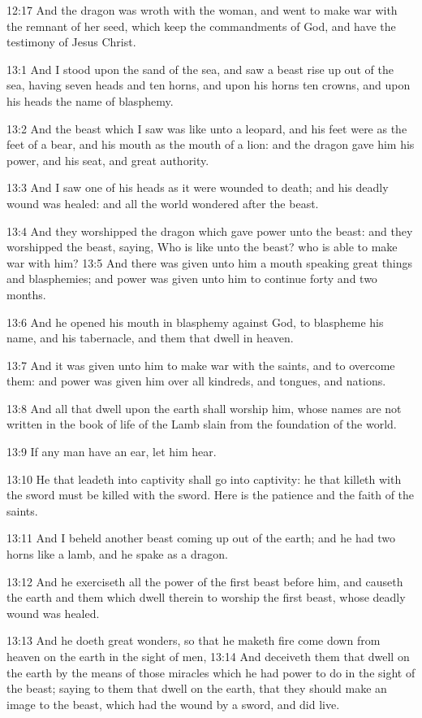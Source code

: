 12:17 And the dragon was wroth with the woman, and went to make war with the remnant of her seed, which keep the commandments of God, and have the testimony of Jesus Christ.

13:1 And I stood upon the sand of the sea, and saw a beast rise up out of the sea, having seven heads and ten horns, and upon his horns ten crowns, and upon his heads the name of blasphemy.

13:2 And the beast which I saw was like unto a leopard, and his feet were as the feet of a bear, and his mouth as the mouth of a lion: and the dragon gave him his power, and his seat, and great authority.

13:3 And I saw one of his heads as it were wounded to death; and his deadly wound was healed: and all the world wondered after the beast.

13:4 And they worshipped the dragon which gave power unto the beast: and they worshipped the beast, saying, Who is like unto the beast? who is able to make war with him?  13:5 And there was given unto him a mouth speaking great things and blasphemies; and power was given unto him to continue forty and two months.

13:6 And he opened his mouth in blasphemy against God, to blaspheme his name, and his tabernacle, and them that dwell in heaven.

13:7 And it was given unto him to make war with the saints, and to overcome them: and power was given him over all kindreds, and tongues, and nations.

13:8 And all that dwell upon the earth shall worship him, whose names are not written in the book of life of the Lamb slain from the foundation of the world.

13:9 If any man have an ear, let him hear.

13:10 He that leadeth into captivity shall go into captivity: he that killeth with the sword must be killed with the sword. Here is the patience and the faith of the saints.

13:11 And I beheld another beast coming up out of the earth; and he had two horns like a lamb, and he spake as a dragon.

13:12 And he exerciseth all the power of the first beast before him, and causeth the earth and them which dwell therein to worship the first beast, whose deadly wound was healed.

13:13 And he doeth great wonders, so that he maketh fire come down from heaven on the earth in the sight of men, 13:14 And deceiveth them that dwell on the earth by the means of those miracles which he had power to do in the sight of the beast; saying to them that dwell on the earth, that they should make an image to the beast, which had the wound by a sword, and did live.


